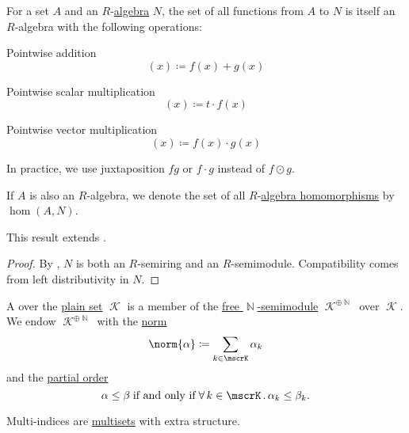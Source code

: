 \begin{proposition}\label{thm:functions_over_algebra}
  For a set \( A \) and an \( R \)-\hyperref[def:algebra_over_semiring]{algebra} \( N \), the set of all functions from \( A \) to \( N \) is itself an \( R \)-algebra with the following operations:
  \begin{thmenum}
     Pointwise addition
    \begin{equation*}
      [f + g](x) \coloneqq f(x) + g(x)
    \end{equation*}

     Pointwise scalar multiplication
    \begin{equation*}
      [t \cdot f](x) \coloneqq t \cdot f(x)
    \end{equation*}

     Pointwise vector multiplication
    \begin{equation*}
      [f \odot g](x) \coloneqq f(x) \cdot g(x)
    \end{equation*}

    In practice, we use juxtaposition \( fg \) or \( f \cdot g \) instead of \( f \odot g \).
  \end{thmenum}

  If \( A \) is also an \( R \)-algebra, we denote the set of all \( R \)-\hyperref[def:algebra_over_semiring/homomorphism]{algebra homomorphisms} by \( \hom(A, N) \).

  This result extends .
\end{proposition}
\begin{proof}
  By , \( N \) is both an \( R \)-semiring and an \( R \)-semimodule. Compatibility comes from left distributivity in \( N \).
\end{proof}

\begin{definition}\label{def:multi_index}\mimprovised
  A  over the \hyperref[def:set]{plain set} \( \mscrK \) is a member of the \hyperref[def:free_semimodule]{free \( \BbbN \)-semimodule} \( \mscrK^{\oplus \BbbN} \) over \( \mscrK \). We endow \( \mscrK^{\oplus \BbbN} \) with the \hyperref[def:norm]{norm}
  \begin{equation*}
    \norm{ \alpha } \coloneqq \sum_{k \in \mscrK} \alpha_k
  \end{equation*}
  and the \hyperref[def:partially_ordered_set]{partial order}
  \begin{equation*}
    \alpha \leq \beta \T{if and only if} \qforall {k \in \mscrK} \alpha_k \leq \beta_k.
  \end{equation*}

  Multi-indices are \hyperref[def:labeled_set/multiset]{multisets} with extra structure.
\end{definition}

